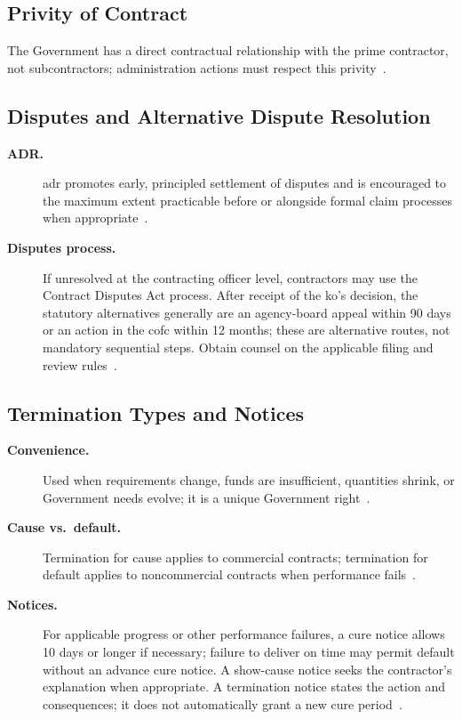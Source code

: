 \documentclass[../main.tex]{subfiles}
\begin{document}
\subsection{Privity of Contract}
The Government has a direct contractual relationship with the prime contractor, not subcontractors; administration actions must respect this privity~\autocite{edo-3-2-6-contract-administration-2025}.

\subsection{Disputes and Alternative Dispute Resolution}
\begin{description}
  \item[\textbf{ADR.}] \ac{adr} promotes early, principled settlement of disputes and is encouraged to the maximum extent practicable before or alongside formal claim processes when appropriate~\autocite{FAR-33-204-ADR-Policy,edo-3-2-6-contract-administration-2025}.
  \item[\textbf{Disputes process.}] If unresolved at the contracting officer level, contractors may use the Contract Disputes Act process. After receipt of the \ac{ko}'s decision, the statutory alternatives generally are an agency-board appeal within 90 days or an action in the \ac{cofc} within 12 months; these are alternative routes, not mandatory sequential steps. Obtain counsel on the applicable filing and review rules~\autocite{USC-41-7104-Contract-Appeals,FAR-33-202-Disputes,edo-3-2-6-contract-administration-2025}.
\end{description}

\subsection{Termination Types and Notices}
\begin{description}
  \item[\textbf{Convenience.}] Used when requirements change, funds are insufficient, quantities shrink, or Government needs evolve; it is a unique Government right~\autocite{edo-3-2-6-contract-administration-2025}.
  \item[\textbf{Cause vs.\ default.}] Termination for cause applies to commercial contracts; termination for default applies to noncommercial contracts when performance fails~\autocite{edo-3-2-6-contract-administration-2025,FAR-52-212-4-Commercial-Terms}.
  \item[\textbf{Notices.}] For applicable progress or other performance failures, a cure notice allows 10 days or longer if necessary; failure to deliver on time may permit default without an advance cure notice. A show-cause notice seeks the contractor's explanation when appropriate. A termination notice states the action and consequences; it does not automatically grant a new cure period~\autocite{edo-3-2-6-contract-administration-2025,FAR-49-402-3-Default-Procedure,FAR-Overhaul-Part49-2026,FAR-49-607-Delinquency-Notices}.
\end{description}
\end{document}

